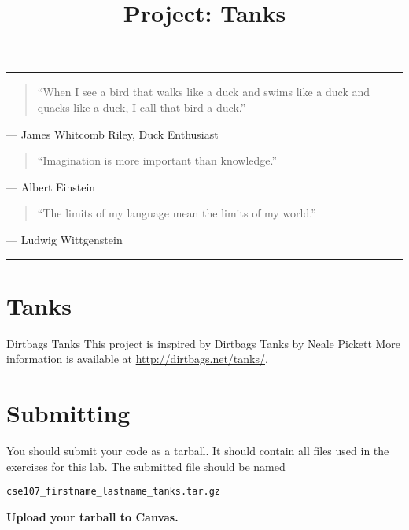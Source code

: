 \documentclass[11pt]{cselabheader}
\title{Project: Tanks}
\begin{document}
\maketitle

\hrule

\begin{quotation}
  ``When I see a bird that walks like a duck and swims like a duck and quacks like
  a duck, I call that bird a duck.''
\end{quotation}
\begin{flushright}
  --- James Whitcomb Riley, Duck Enthusiast
\end{flushright}



\begin{quotation}
``Imagination is more important than knowledge.''
\end{quotation}
\begin{flushright}
  --- Albert Einstein
\end{flushright}

\begin{quotation}
``The limits of my language mean the limits of my world.''
\end{quotation}
\begin{flushright}
  --- Ludwig Wittgenstein
\end{flushright}

\hrule


\section{Tanks}

\begin{warningbox}{Dirtbags Tanks}
  This project is inspired by Dirtbags Tanks by Neale Pickett
  More information is available at \url{http://dirtbags.net/tanks/}.
\end{warningbox}

\begin{ex}[tank.py]
  
\end{ex}

\pagebreak
\section{Submitting}
You should submit your code as a tarball. It should contain all files
used in the exercises for this lab. The submitted file should be named
\begin{center}
  \texttt{cse107\_firstname\_lastname\_tanks.tar.gz}
\end{center}

\begin{center}
  \textbf{Upload your tarball to Canvas.}
\end{center}

\listoftheorems
\end{document}
